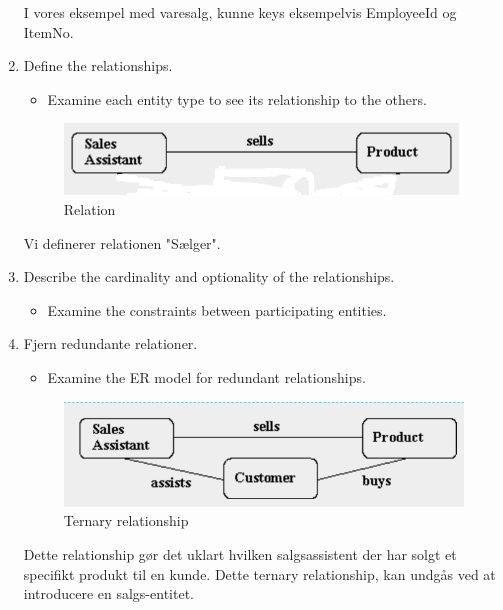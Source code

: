 \begin{enumerate}
	I vores eksempel med varesalg, kunne keys eksempelvis EmployeeId og ItemNo.
	
	\item Define the relationships.
	
	\begin{itemize}
		\item Examine each entity type to see its relationship to the others.
	\end{itemize}
	
	\begin{figure}[H]
		\centering
		\includegraphics[width=0.7\linewidth]{figs/spm1/salesProductRelation.png}
		\caption{Relation}
		\label{fig:salesProductRelation}
	\end{figure}
	
	Vi definerer relationen "Sælger".

	
	\item Describe the cardinality and optionality of the relationships.
	
	\begin{itemize}
		\item Examine the constraints between participating entities.
	\end{itemize}
	
	\item Fjern redundante relationer.
	
	\begin{itemize}
		\item Examine the ER model for redundant relationships.
	\end{itemize}
	
	\begin{figure}[H]
		\centering
		\includegraphics[width=0.7\linewidth]{figs/spm1/ternaryRelation.PNG}
		\caption{Ternary relationship}
		\label{fig:ternaryRelation}
	\end{figure}
	
	Dette relationship gør det uklart hvilken salgsassistent der har solgt et specifikt produkt til en kunde.
	Dette ternary relationship, kan undgås ved at introducere en salgs-entitet.
	

\end{enumerate}
